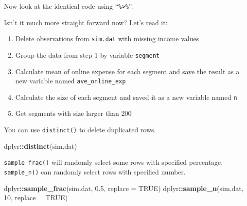 \documentclass[
]{article}
\newenvironment{Shaded}{\begin{snugshade}}{\end{snugshade}}
\newcommand{\DataTypeTok}[1]{\textcolor[rgb]{0.13,0.29,0.53}{#1}}
\newcommand{\DecValTok}[1]{\textcolor[rgb]{0.00,0.00,0.81}{#1}}
\newcommand{\FloatTok}[1]{\textcolor[rgb]{0.00,0.00,0.81}{#1}}
\newcommand{\KeywordTok}[1]{\textcolor[rgb]{0.13,0.29,0.53}{\textbf{#1}}}
\newcommand{\NormalTok}[1]{#1}
\newcommand{\OperatorTok}[1]{\textcolor[rgb]{0.81,0.36,0.00}{\textbf{#1}}}
\newcommand{\OtherTok}[1]{\textcolor[rgb]{0.56,0.35,0.01}{#1}}
\newcommand{\StringTok}[1]{\textcolor[rgb]{0.31,0.60,0.02}{#1}}
\providecommand{\tightlist}{%
  \setlength{\itemsep}{0pt}\setlength{\parskip}{0pt}}
\begin{document}
Now look at the identical code using ``\texttt{\%\textgreater{}\%}'':

\begin{Shaded}
\end{Shaded}

Isn't it much more straight forward now? Let's read it:

\begin{enumerate}
\def\labelenumi{\arabic{enumi}.}
\tightlist
\item
  Delete observations from \texttt{sim.dat} with missing income values
\item
  Group the data from step 1 by variable \texttt{segment}
\item
  Calculate mean of online expense for each segment and save the result
  as a new variable named \texttt{ave\_online\_exp}
\item
  Calculate the size of each segment and saved it as a new variable
  named \texttt{n}
\item
  Get segments with size larger than 200
\end{enumerate}

You can use \texttt{distinct()} to delete duplicated rows.

\begin{Shaded}
\begin{Highlighting}[]
\NormalTok{dplyr}\OperatorTok{::}\KeywordTok{distinct}\NormalTok{(sim.dat)}
\end{Highlighting}
\end{Shaded}

\texttt{sample\_frac()} will randomly select some rows with specified
percentage. \texttt{sample\_n()} can randomly select rows with specified
number.

\begin{Shaded}
\begin{Highlighting}[]
\NormalTok{dplyr}\OperatorTok{::}\KeywordTok{sample_frac}\NormalTok{(sim.dat, }\FloatTok{0.5}\NormalTok{, }\DataTypeTok{replace =} \OtherTok{TRUE}\NormalTok{) }
\NormalTok{dplyr}\OperatorTok{::}\KeywordTok{sample_n}\NormalTok{(sim.dat, }\DecValTok{10}\NormalTok{, }\DataTypeTok{replace =} \OtherTok{TRUE}\NormalTok{) }
\end{Highlighting}
\end{Shaded}
\end{document}
